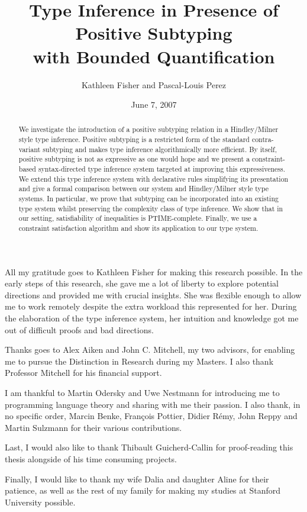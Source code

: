 \documentclass{report}
\title{Type Inference in Presence of Positive Subtyping\\with Bounded Quantification}
\author{Kathleen Fisher and Pascal-Louis Perez}
\date{June 7, 2007}
\begin{document}
  \maketitle
  
  \begin{abstract}
     We investigate the introduction of a positive subtyping relation
     in a Hindley/Milner style type inference. Positive subtyping is a restricted
     form of the standard contra-variant subtyping and makes type inference
     algorithmically more efficient. By itself, positive
     subtyping is not as expressive as one would hope and
     we present a constraint-based syntax-directed type inference system targeted at
     improving this expressiveness. We extend this type inference system with
     declarative rules simplifying its presentation and give a formal comparison
     between our system and Hindley/Milner style type systems.
     In particular, we prove that subtyping can be incorporated into an existing type system
     whilst preserving the complexity class of type inference. We show that in our
     setting, satisfiability of inequalities is PTIME-complete. Finally, we use a constraint
     satisfaction algorithm and show its application to our type system.
  \end{abstract}
  
    All my gratitude goes to Kathleen Fisher for making this research possible.
    In the early steps of this research, she gave me a lot of liberty to explore
    potential directions and provided me with crucial insights. She was flexible
    enough to allow me to work remotely despite the extra workload this
    represented for her. During the elaboration of the type inference system,
    her intuition and knowledge got me out of difficult proofs and bad directions.
    \\
    \par\noindent\noindent\ignorespaces Thanks goes to Alex Aiken and 
    John C. Mitchell, my two advisors, for
    enabling me to pursue the Distinction in Research during my Masters.
    I also thank Professor Mitchell for his financial support.
    \\
    \par\noindent\noindent\ignorespaces I am thankful to Martin Odersky
    and Uwe Nestmann for introducing me to programming language theory and
    sharing with me their passion. I also thank, in no specific order,    
    Marcin Benke, Fran\c{c}ois Pottier, Didier R\'emy, John Reppy and Martin Sulzmann
    for their various contributions.
    \\
    \par\noindent\noindent\ignorespaces Last, I would also like to thank
    Thibault Guicherd-Callin for proof-reading
    this thesis alongside of his time consuming projects.
    \\
    \par\noindent\noindent\ignorespaces Finally, I would like to thank
    my wife Dalia and daughter Aline for their
    patience, as well as the rest of my family for making my studies at Stanford
    University possible.
  \tableofcontents
  
\end{document}
